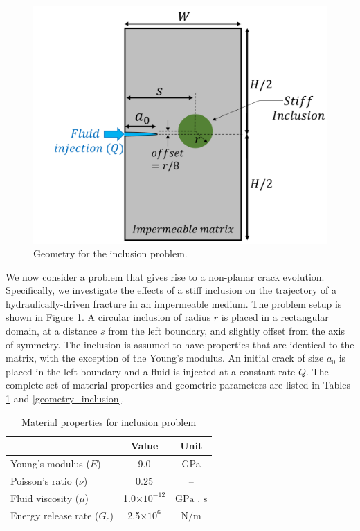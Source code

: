 \begin{figure}[!htbp]
    \centering
    \includegraphics[width=.8\linewidth]{img/inclusion_prob/Inc_prob_updated.png}
    \caption{Geometry for the inclusion problem.}
    \label{fig:description_inc_prob}
\end{figure}

We now consider a problem that gives rise to a non-planar crack evolution.  Specifically, we  investigate the effects of a stiff inclusion on the trajectory of a hydraulically-driven fracture in an impermeable medium. The problem setup is shown in Figure \ref{fig:description_inc_prob}. A circular inclusion of radius $r$ is placed in a rectangular domain, at a distance $s$ from the left boundary, and slightly offset from the axis of symmetry. The inclusion is assumed to have properties that are identical to the matrix, with the exception of the Young's modulus.  
An initial crack of size $a_0$ is placed in the left boundary and a fluid is injected at a constant rate $Q$. The complete set of material properties and geometric parameters are listed in Tables \ref{materials_inclusion} and \ref{geometry_inclusion}.

\begin{table}[ht]
\centering
\caption{Material properties for inclusion problem}
\begin{tabular}[t]{lcc}
\hline
&Value &Unit \\
\hline
Young's modulus ($E$)&9.0&GPa\\
Poisson's ratio ($\nu$)&0.25&--\\
Fluid viscosity ($\mu$)&1.0$\times10^{-12}$&$\text{GPa . s}$\\
Energy release rate ($G_c$)&2.5$\times10^{6}$&$\text{N/m}$\\
\hline
\end{tabular}
\label{materials_inclusion}
\end{table}%

